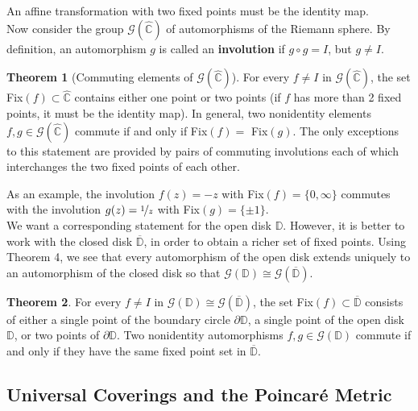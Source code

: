 \documentclass{article}
\theoremstyle{definition}
\newtheorem{theorem}{Theorem}
\begin{document}
    An affine transformation with two fixed points must be the identity map.\\

    Now consider the group $\mathcal{G}(\hat{\mathbb{C}})$ of automorphisms of the Riemann sphere. By definition, an automorphism
    $g$ is called an \textbf{involution} if $g\circ g = I$, but $g\neq I$.

    \begin{theorem}[Commuting elements of $\mathcal{G}(\hat{\mathbb{C}})$]
        For every $f\neq I$ in $\mathcal{G}(\hat{\mathbb{C}})$, the set Fix$(f) \subset \hat{\mathbb{C}}$ contains either one point
        or two points (if $f$ has more than 2 fixed points, it must be the identity map). In general, two nonidentity elements
        $f,g\in\mathcal{G}(\hat{\mathbb{C}})$ commute if and only if Fix$(f) =$ Fix$(g)$. The only exceptions to this statement
        are provided by pairs of commuting involutions each of which interchanges the two fixed points of each other.
    \end{theorem}

    As an example, the involution $f(z)=-z$ with Fix$(f) = \{0,\infty\}$ commutes with the involution $g(z) = \nicefrac{1}{z}$ with
    Fix$(g) = \{\pm 1\}$.\\

    We want a corresponding statement for the open disk $\mathbb{D}$. However, it is better to work with the closed disk
    $\overline{\mathbb{D}}$, in order to obtain a richer set of fixed points. Using Theorem 4, we see that every automorphism
    of the open disk extends uniquely to an automorphism of the closed disk so that $\mathcal{G}(\mathbb{D})\cong
    \mathcal{G}(\overline{\mathbb{D}})$.

    \begin{theorem}
        For every $f\neq I$ in $\mathcal{G}(\mathbb{D})\cong \mathcal{G}(\overline{\mathbb{D}})$, the set
        Fix$(f)\subset\overline{\mathbb{D}}$ consists of either a single point of the boundary circle $\partial{\mathbb{D}}$, a
        single point of the open disk $\mathbb{D}$, or two points of $\partial{\mathbb{D}}$. Two nonidentity automorphisms
        $f,g\in\mathcal{G}(\mathbb{D})$ commute if and only if they have the same fixed point set in $\overline{\mathbb{D}}$.
    \end{theorem}

    \newpage

    \subsection{Universal Coverings and the Poincaré Metric}
\end{document}
